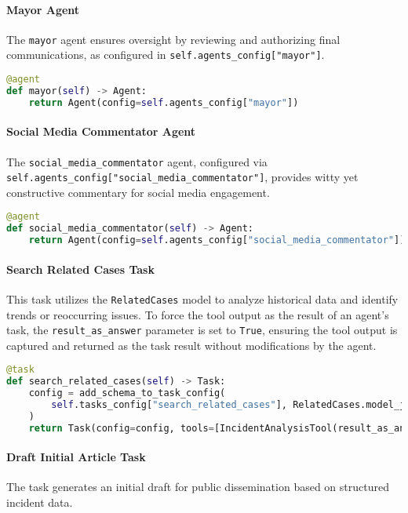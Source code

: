 \paragraph{Mayor Agent}
The \texttt{mayor} agent ensures oversight by reviewing and authorizing final communications, as configured in \newline \texttt{self.agents\_config["mayor"]}.

\begin{lstlisting}[language=Python]
@agent
def mayor(self) -> Agent:
    return Agent(config=self.agents_config["mayor"])
\end{lstlisting}

\paragraph{Social Media Commentator Agent}
The \texttt{social\_media\_commentator} agent, configured via \newline \texttt{self.agents\_config["social\_media\_commentator"]}, provides witty yet constructive commentary for social media engagement.

\begin{lstlisting}[language=Python]
@agent
def social_media_commentator(self) -> Agent:
    return Agent(config=self.agents_config["social_media_commentator"])
\end{lstlisting}

\paragraph{Search Related Cases Task}
This task utilizes the \texttt{RelatedCases} model to analyze historical data and identify trends or reoccurring issues. To force the tool output as the result of an agent's task, the \texttt{result\_as\_answer} parameter is set to \texttt{True}, ensuring the tool output is captured and returned as the task result without modifications by the agent.

\begin{lstlisting}[language=Python]
@task
def search_related_cases(self) -> Task:
    config = add_schema_to_task_config(
        self.tasks_config["search_related_cases"], RelatedCases.model_json_schema()
    )
    return Task(config=config, tools=[IncidentAnalysisTool(result_as_answer=True)])
\end{lstlisting}

\paragraph{Draft Initial Article Task}
The task generates an initial draft for public dissemination based on structured incident data.

